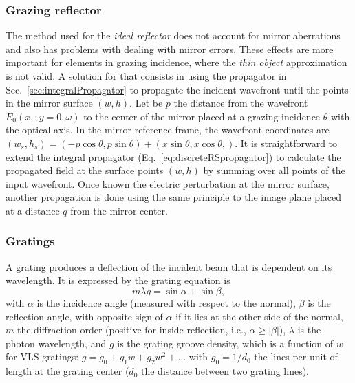 \documentclass{iucr}              %
\begin{document}
\subsubsection{Grazing reflector}
\label{sec:grazingReflector}

The method used for the {\it ideal reflector} does not account for mirror aberrations and also has problems with dealing with mirror errors. These effects are more important for elements in grazing incidence, where the {\it thin object} approximation is not valid. A solution for that consists in using the propagator in Sec.~\ref{sec:integralPropagator} to propagate the incident wavefront until the points in the mirror surface $(w,h)$. Let be $p$ the distance from the wavefront $E_0(x,;y=0,\omega)$ to the center of the mirror placed at a grazing incidence $\theta$ with the optical axis. In the mirror reference frame, the wavefront coordinates are $(w_s, h_s) =(-p \cos \theta, p \sin \theta) + (x \sin \theta, x \cos \theta,)$. It is straightforward to extend the integral propagator (Eq.~\ref{eq:discreteRSpropagator}) to calculate the propagated field at the surface points $(w,h)$ by summing over all points of the input wavefront. Once known the electric perturbation at the mirror surface, another propagation is done using the same principle to the image plane placed at a distance $q$ from the  mirror center. 

\subsubsection{Gratings}
\label{sec:grating}

A grating produces a deflection of the incident beam that is dependent on its wavelength. It is expressed by the grating equation is
\begin{equation}
    m \lambda g = \sin\alpha + \sin\beta,
\end{equation}
with $\alpha$ is the incidence angle (measured with respect to the normal), $\beta$ is the reflection angle, with opposite sign of $\alpha$ if it lies at the other side of the normal, $m$ the diffraction order (positive for inside reflection, i.e., $\alpha \ge |\beta|$),
$\lambda$ is the photon wavelength, and $g$ is the grating groove density, which is a function of $w$ for VLS gratings: $g = g_0 + g_1 w + g_2 w^2 + ...$ with $g_0 = 1/d_0$ the lines per unit of length at the grating center ($d_0$ the distance between two grating lines).
\end{document}
